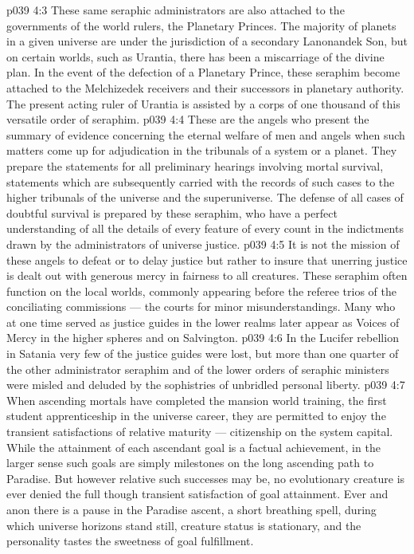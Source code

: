 \vs p039 4:3 These same seraphic administrators are also attached to the governments of the world rulers, the Planetary Princes. The majority of planets in a given universe are under the jurisdiction of a secondary Lanonandek Son, but on certain worlds, such as Urantia, there has been a miscarriage of the divine plan. In the event of the defection of a Planetary Prince, these seraphim become attached to the Melchizedek receivers and their successors in planetary authority. The present acting ruler of Urantia is assisted by a corps of one thousand of this versatile order of seraphim.
\vs p039 4:4 \pc {}\bibnobreakspace {} These are the angels who present the summary of evidence concerning the eternal welfare of men and angels when such matters come up for adjudication in the tribunals of a system or a planet. They prepare the statements for all preliminary hearings involving mortal survival, statements which are subsequently carried with the records of such cases to the higher tribunals of the universe and the superuniverse. The defense of all cases of doubtful survival is prepared by these seraphim, who have a perfect understanding of all the details of every feature of every count in the indictments drawn by the administrators of universe justice.
\vs p039 4:5 It is not the mission of these angels to defeat or to delay justice but rather to insure that unerring justice is dealt out with generous mercy in fairness to all creatures. These seraphim often function on the local worlds, commonly appearing before the referee trios of the conciliating commissions --- the courts for minor misunderstandings. Many who at one time served as justice guides in the lower realms later appear as Voices of Mercy in the higher spheres and on Salvington.
\vs p039 4:6 In the Lucifer rebellion in Satania very few of the justice guides were lost, but more than one quarter of the other administrator seraphim and of the lower orders of seraphic ministers were misled and deluded by the sophistries of unbridled personal liberty.
\vs p039 4:7 \pc {}\bibnobreakspace {} When ascending mortals have completed the mansion world training, the first student apprenticeship in the universe career, they are permitted to enjoy the transient satisfactions of relative maturity --- citizenship on the system capital. While the attainment of each ascendant goal is a factual achievement, in the larger sense such goals are simply milestones on the long ascending path to Paradise. But however relative such successes may be, no evolutionary creature is ever denied the full though transient satisfaction of goal attainment. Ever and anon there is a pause in the Paradise ascent, a short breathing spell, during which universe horizons stand still, creature status is stationary, and the personality tastes the sweetness of goal fulfillment.
